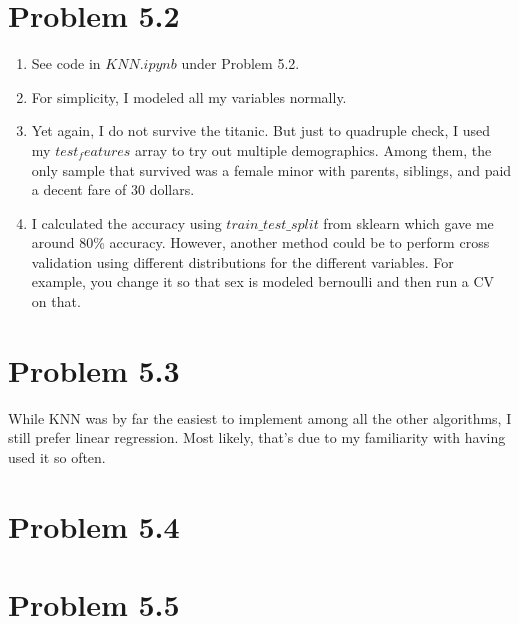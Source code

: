 \documentclass{article}
\begin{document}
\section*{Problem 5.2}
\begin{enumerate}[label=(\alph*)]
  \item See code in $KNN.ipynb$ under Problem 5.2.
  \item For simplicity, I modeled all my variables normally.
  \item Yet again, I do not survive the titanic. But just to quadruple check, I used my $test_features$ array to try out multiple demographics. Among them, the only sample that survived was a female minor with parents, siblings, and paid a decent fare of 30 dollars.
  \item I calculated the accuracy using $train\_test\_split$ from sklearn which gave me around 80\% accuracy. However, another method could be to perform cross validation using different distributions for the different variables. For example, you change it so that sex is modeled bernoulli and then run a CV on that.
\end{enumerate}

\section*{Problem 5.3}

While KNN was by far the easiest to implement among all the other algorithms, I still prefer linear regression. Most likely, that's due to my familiarity with having used it so often.

\section*{Problem 5.4}



\section*{Problem 5.5}
\end{document}
